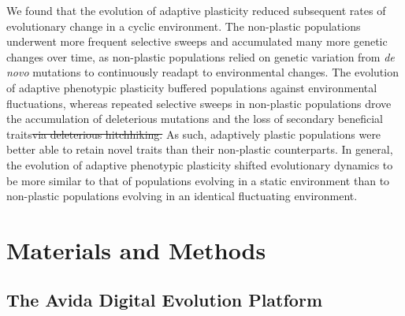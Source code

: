 \documentclass[utf8]{frontiersSCNS} %
\providecommand{\DIFaddtex}[1]{{\protect\color{blue}\uwave{#1}}} %
\providecommand{\DIFdeltex}[1]{{\protect\color{red}\sout{#1}}}                      %
\providecommand{\DIFaddbegin}{} %
\providecommand{\DIFaddend}{} %
\providecommand{\DIFdelbegin}{} %
\providecommand{\DIFdelend}{} %
\providecommand{\DIFadd}[1]{\texorpdfstring{\DIFaddtex{#1}}{#1}} %
\providecommand{\DIFdel}[1]{\texorpdfstring{\DIFdeltex{#1}}{}} %
\newcommand{\DIFscaledelfig}{0.5}
\newlength{\DIFdelgraphicswidth} %
\newlength{\DIFdelgraphicsheight} %
\newcommand{\DIFaddincludegraphics}[2][]{{\color{blue}\fbox{\DIFOincludegraphics[#1]{#2}}}} %
\newcommand{\DIFdelincludegraphics}[2][]{%
\sbox{\DIFdelgraphicsbox}{\DIFOincludegraphics[#1]{#2}}%
\settoboxwidth{\DIFdelgraphicswidth}{\DIFdelgraphicsbox} %
\settoboxtotalheight{\DIFdelgraphicsheight}{\DIFdelgraphicsbox} %
\scalebox{\DIFscaledelfig}{%
\parbox[b]{\DIFdelgraphicswidth}{\usebox{\DIFdelgraphicsbox}\\[-\baselineskip] \rule{\DIFdelgraphicswidth}{0em}}\llap{\resizebox{\DIFdelgraphicswidth}{\DIFdelgraphicsheight}{%
\setlength{\unitlength}{\DIFdelgraphicswidth}%
\begin{picture}(1,1)%
\thicklines\linethickness{2pt} %
{\color[rgb]{1,0,0}\put(0,0){\framebox(1,1){}}}%
{\color[rgb]{1,0,0}\put(0,0){\line( 1,1){1}}}%
{\color[rgb]{1,0,0}\put(0,1){\line(1,-1){1}}}%
\end{picture}%
}\hspace*{3pt}}} %
} %
\DeclareRobustCommand{\DIFaddbegin}{\DIFOaddbegin \let\includegraphics\DIFaddincludegraphics} %
\DeclareRobustCommand{\DIFaddend}{\DIFOaddend \let\includegraphics\DIFOincludegraphics} %
\DeclareRobustCommand{\DIFdelbegin}{\DIFOdelbegin \let\includegraphics\DIFdelincludegraphics} %
\DeclareRobustCommand{\DIFdelend}{\DIFOaddend \let\includegraphics\DIFOincludegraphics} %
\begin{document}
\begin{raggedbottom}
We found that the evolution of adaptive plasticity reduced subsequent rates of evolutionary change in a cyclic environment.
The non-plastic populations underwent more frequent selective sweeps and accumulated many more genetic changes over time, as non-plastic populations relied on genetic variation from \textit{de novo} mutations to continuously readapt to environmental changes.
The evolution of adaptive phenotypic plasticity buffered populations against environmental fluctuations, whereas repeated selective sweeps in non-plastic populations drove the accumulation of deleterious mutations and the loss of secondary beneficial traits\DIFdelbegin \DIFdel{via deleterious hitchhiking. }\DIFdelend \DIFaddbegin \DIFadd{. %
}\DIFaddend As such, adaptively plastic populations were better able to retain novel traits than their non-plastic counterparts.
In general, the evolution of adaptive phenotypic plasticity shifted evolutionary dynamics to be more similar to that of populations evolving in a static environment than to non-plastic populations evolving in an identical fluctuating environment.

\DIFdelbegin %

\DIFdelend \section{Materials and Methods}
\DIFaddbegin \label{sec:methods}
\DIFaddend 

\subsection{The Avida Digital Evolution Platform}
\DIFaddbegin \label{sec:methods:avida}
\DIFaddend 


\end{raggedbottom}
\end{document}
